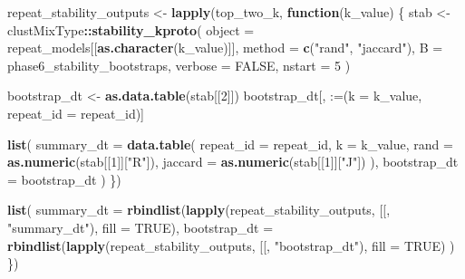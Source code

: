 \documentclass[
]{article}
\newenvironment{Shaded}{\begin{snugshade}}{\end{snugshade}}
\newcommand{\AttributeTok}[1]{\textcolor[rgb]{0.13,0.29,0.53}{#1}}
\newcommand{\ConstantTok}[1]{\textcolor[rgb]{0.56,0.35,0.01}{#1}}
\newcommand{\ControlFlowTok}[1]{\textcolor[rgb]{0.13,0.29,0.53}{\textbf{#1}}}
\newcommand{\DecValTok}[1]{\textcolor[rgb]{0.00,0.00,0.81}{#1}}
\newcommand{\FunctionTok}[1]{\textcolor[rgb]{0.13,0.29,0.53}{\textbf{#1}}}
\newcommand{\NormalTok}[1]{#1}
\newcommand{\OtherTok}[1]{\textcolor[rgb]{0.56,0.35,0.01}{#1}}
\newcommand{\SpecialCharTok}[1]{\textcolor[rgb]{0.81,0.36,0.00}{\textbf{#1}}}
\newcommand{\StringTok}[1]{\textcolor[rgb]{0.31,0.60,0.02}{#1}}
\begin{document}
\begin{Shaded}
\begin{Highlighting}[]
\NormalTok{      repeat\_stability\_outputs }\OtherTok{\textless{}{-}} \FunctionTok{lapply}\NormalTok{(top\_two\_k, }\ControlFlowTok{function}\NormalTok{(k\_value) \{}
\NormalTok{        stab }\OtherTok{\textless{}{-}}\NormalTok{ clustMixType}\SpecialCharTok{::}\FunctionTok{stability\_kproto}\NormalTok{(}
          \AttributeTok{object =}\NormalTok{ repeat\_models[[}\FunctionTok{as.character}\NormalTok{(k\_value)]],}
          \AttributeTok{method =} \FunctionTok{c}\NormalTok{(}\StringTok{"rand"}\NormalTok{, }\StringTok{"jaccard"}\NormalTok{),}
          \AttributeTok{B =}\NormalTok{ phase6\_stability\_bootstraps,}
          \AttributeTok{verbose =} \ConstantTok{FALSE}\NormalTok{,}
          \AttributeTok{nstart =} \DecValTok{5}
\NormalTok{        )}

\NormalTok{        bootstrap\_dt }\OtherTok{\textless{}{-}} \FunctionTok{as.data.table}\NormalTok{(stab[[}\DecValTok{2}\NormalTok{]])}
\NormalTok{        bootstrap\_dt[, }\StringTok{\textasciigrave{}}\AttributeTok{:=}\StringTok{\textasciigrave{}}\NormalTok{(}\AttributeTok{k =}\NormalTok{ k\_value, }\AttributeTok{repeat\_id =}\NormalTok{ repeat\_id)]}

        \FunctionTok{list}\NormalTok{(}
          \AttributeTok{summary\_dt =} \FunctionTok{data.table}\NormalTok{(}
            \AttributeTok{repeat\_id =}\NormalTok{ repeat\_id,}
            \AttributeTok{k =}\NormalTok{ k\_value,}
            \AttributeTok{rand =} \FunctionTok{as.numeric}\NormalTok{(stab[[}\DecValTok{1}\NormalTok{]][}\StringTok{"R"}\NormalTok{]),}
            \AttributeTok{jaccard =} \FunctionTok{as.numeric}\NormalTok{(stab[[}\DecValTok{1}\NormalTok{]][}\StringTok{"J"}\NormalTok{])}
\NormalTok{          ),}
          \AttributeTok{bootstrap\_dt =}\NormalTok{ bootstrap\_dt}
\NormalTok{        )}
\NormalTok{      \})}

      \FunctionTok{list}\NormalTok{(}
        \AttributeTok{summary\_dt =} \FunctionTok{rbindlist}\NormalTok{(}\FunctionTok{lapply}\NormalTok{(repeat\_stability\_outputs, }\StringTok{\textasciigrave{}}\AttributeTok{[[}\StringTok{\textasciigrave{}}\NormalTok{, }\StringTok{"summary\_dt"}\NormalTok{), }\AttributeTok{fill =} \ConstantTok{TRUE}\NormalTok{),}
        \AttributeTok{bootstrap\_dt =} \FunctionTok{rbindlist}\NormalTok{(}\FunctionTok{lapply}\NormalTok{(repeat\_stability\_outputs, }\StringTok{\textasciigrave{}}\AttributeTok{[[}\StringTok{\textasciigrave{}}\NormalTok{, }\StringTok{"bootstrap\_dt"}\NormalTok{), }\AttributeTok{fill =} \ConstantTok{TRUE}\NormalTok{)}
\NormalTok{      )}
\NormalTok{    \})}


\end{Highlighting}
\end{Shaded}
\end{document}
